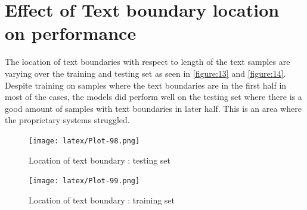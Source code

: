 \documentclass[11pt]{article}
\begin{document}
\section{Effect of Text boundary location on performance}
\label{sec:appendix_D}
The location of text boundaries with respect to length of the text samples are varying over the training and testing set as seen in \autoref{figure:13} and \autoref{figure:14}. Despite training on samples where the text boundaries are in the first half in most of the cases, the models did perform well on the testing set where there is a good amount of samples with text boundaries in later half. This is an area where the proprietary systems struggled. 
\begin{figure}[ht]
\centering
\texttt{[image: latex/Plot-98.png]}
\caption{Location of text boundary : testing set}
\label{figure:13}
\end{figure}
\begin{figure}[ht]
\centering
\texttt{[image: latex/Plot-99.png]}
\caption{Location of text boundary : training set}
\label{figure:14}
\end{figure}
\end{document}

